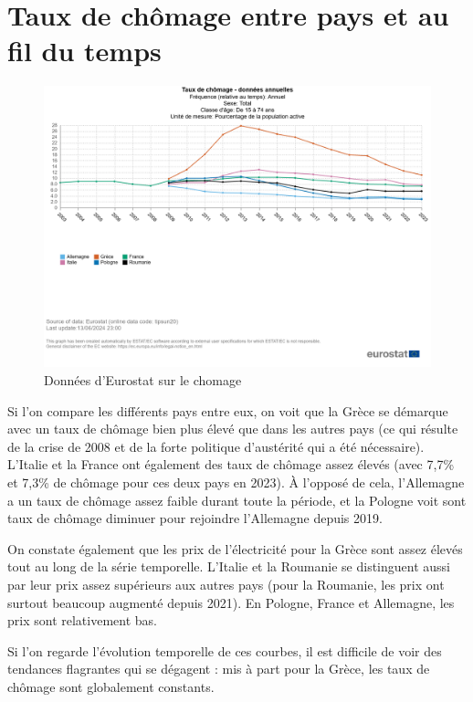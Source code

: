 \documentclass{article}
\begin{document}
\section{Taux de chômage entre pays et au fil du temps}
\begin{figure}[H]
  \centering
  \begin{minipage}{0.8\textwidth}
      \centering
      \includegraphics[width=\textwidth]{"chomage.png"}
      \caption{Données d'Eurostat sur le chomage}
  \end{minipage}
\end{figure}

Si l'on compare les différents pays entre eux, on voit que la Grèce se démarque avec un taux de chômage bien plus élevé que dans les autres pays (ce qui résulte de la crise de 2008 et de la forte politique d'austérité qui a été nécessaire). L'Italie et la France ont également des taux de chômage assez élevés (avec 7,7\% et 7,3\% de chômage pour ces deux pays en 2023). À l'opposé de cela, l'Allemagne a un taux de chômage assez faible durant toute la période, et la Pologne voit sont taux de chômage diminuer pour rejoindre l'Allemagne depuis 2019.

On constate également que les prix de l'électricité pour la Grèce sont assez élevés tout au long de la série temporelle. L'Italie et la Roumanie se distinguent aussi par leur prix assez supérieurs aux autres pays (pour la Roumanie, les prix ont surtout beaucoup augmenté depuis 2021). En Pologne, France et Allemagne, les prix sont relativement bas.

Si l'on regarde l'évolution temporelle de ces courbes, il est difficile de voir des tendances flagrantes qui se dégagent : mis à part pour la Grèce, les taux de chômage sont globalement constants.
\end{document}
